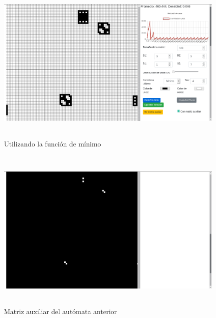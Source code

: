 \documentclass[12pt, titlepage]{article}
\begin{document}
\begin{figure}[H]
\begin{center}
 \includegraphics[width=15cm, height=8cm]{./img/3317-min.png}
 \caption{Utilizando la función de mínimo}
 \label{fig:3317-min}
\end{center}
\end{figure}

\begin{figure}[H]
\begin{center}
 \includegraphics[width=15cm, height=8cm]{./img/3317-min-aux.png}
 \caption{Matriz auxiliar del autómata anterior}
 \label{fig:3317-min-aux}
\end{center}
\end{figure}
\end{document}
